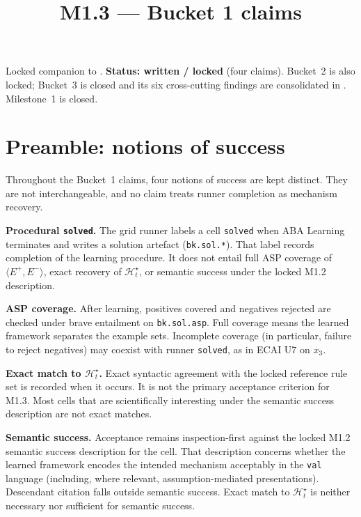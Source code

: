 \documentclass[11pt]{article}
\title{M1.3 --- Bucket 1 claims}
\author{}
\date{}
\begin{document}
\maketitle

Locked companion to .
\textbf{Status: written / locked} (four claims). Bucket~2 is also locked; Bucket~3 is
closed and its six cross-cutting findings are consolidated in
.
Milestone~1 is closed.

\section{Preamble: notions of success}

Throughout the Bucket~1 claims, four notions of success are kept distinct. They are not interchangeable, and no claim treats runner completion as mechanism recovery.

\textbf{Procedural \texttt{solved}.} The grid runner labels a cell \texttt{solved} when ABA Learning terminates and writes a solution artefact (\texttt{bk.sol.*}). That label records completion of the learning procedure. It does not entail full ASP coverage of \(\langle E^+,E^-\rangle\), exact recovery of \(\mathcal{H}_t^\star\), or semantic success under the locked M1.2 description.

\textbf{ASP coverage.} After learning, positives covered and negatives rejected are checked under brave entailment on \texttt{bk.sol.asp}. Full coverage means the learned framework separates the example sets. Incomplete coverage (in particular, failure to reject negatives) may coexist with runner \texttt{solved}, as in ECAI U7 on \(x_3\).

\textbf{Exact match to \(\mathcal{H}_t^\star\).} Exact syntactic agreement with the locked reference rule set is recorded when it occurs. It is not the primary acceptance criterion for M1.3. Most cells that are scientifically interesting under the semantic success description are not exact matches.

\textbf{Semantic success.} Acceptance remains inspection-first against the locked M1.2 semantic success description for the cell. That description concerns whether the learned framework encodes the intended mechanism acceptably in the \texttt{val} language (including, where relevant, assumption-mediated presentations). Descendant citation falls outside semantic success. Exact match to \(\mathcal{H}_t^\star\) is neither necessary nor sufficient for semantic success.
\end{document}
